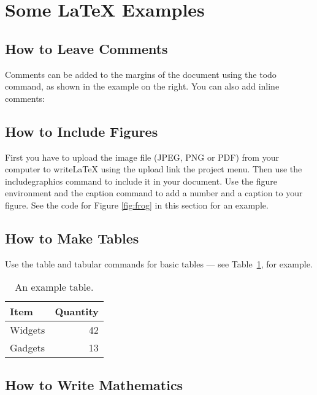 \documentclass[a4paper]{article}
\begin{document}
\section{Some \LaTeX{} Examples}
\label{sec:examples}

\subsection{How to Leave Comments}

Comments can be added to the margins of the document using the  todo command, as shown in the example on the right. You can also add inline comments:


\subsection{How to Include Figures}

First you have to upload the image file (JPEG, PNG or PDF) from your computer to writeLaTeX using the upload link the project menu. Then use the includegraphics command to include it in your document. Use the figure environment and the caption command to add a number and a caption to your figure. See the code for Figure \ref{fig:frog} in this section for an example.


\subsection{How to Make Tables}

Use the table and tabular commands for basic tables --- see Table~\ref{tab:widgets}, for example.

\begin{table}
\centering
\begin{tabular}{l|r}
Item & Quantity \\\hline
Widgets & 42 \\
Gadgets & 13
\end{tabular}
\caption{\label{tab:widgets}An example table.}
\end{table}

\subsection{How to Write Mathematics}
\end{document}
